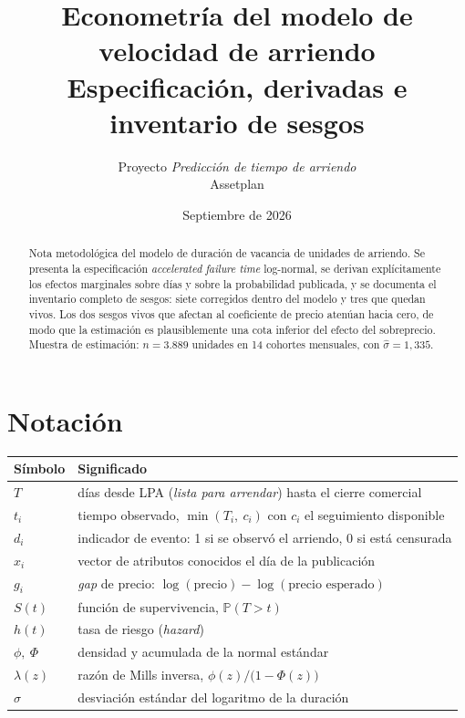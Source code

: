 \documentclass[11pt,a4paper]{article}
\title{\bfseries Econometría del modelo de velocidad de arriendo\\[2pt]
\large Especificación, derivadas e inventario de sesgos}
\author{Proyecto \emph{Predicción de tiempo de arriendo}\\ Assetplan}
\date{Septiembre de 2026}
\theoremstyle{definition}
\newcommand{\Prob}{\mathbb{P}}
\begin{document}
\maketitle

\begin{abstract}
\noindent
Nota metodológica del modelo de duración de vacancia de unidades de arriendo.
Se presenta la especificación \emph{accelerated failure time} log-normal, se
derivan explícitamente los efectos marginales sobre días y sobre la probabilidad
publicada, y se documenta el inventario completo de sesgos: siete corregidos
dentro del modelo y tres que quedan vivos. Los dos sesgos vivos que afectan al
coeficiente de precio atenúan hacia cero, de modo que la estimación es
plausiblemente una cota inferior del efecto del sobreprecio. Muestra de
estimación: $n=3.889$ unidades en 14 cohortes mensuales, con
$\hat{\sigma}=1{,}335$.
\end{abstract}

\tableofcontents
\bigskip

\section{Notación}

\begin{table}[h]
\centering
\begin{tabular}{@{}ll@{}}
\toprule
Símbolo & Significado \\
\midrule
$T$ & días desde LPA (\emph{lista para arrendar}) hasta el cierre comercial \\
$t_i$ & tiempo observado, $\min(T_i,\ c_i)$ con $c_i$ el seguimiento disponible \\
$d_i$ & indicador de evento: 1 si se observó el arriendo, 0 si está censurada \\
$x_i$ & vector de atributos conocidos el día de la publicación \\
$g_i$ & \emph{gap} de precio: $\log(\text{precio}) - \log(\text{precio esperado})$ \\
$S(t)$ & función de supervivencia, $\Prob(T>t)$ \\
$h(t)$ & tasa de riesgo (\emph{hazard}) \\
$\phi,\ \Phi$ & densidad y acumulada de la normal estándar \\
$\lambda(z)$ & razón de Mills inversa, $\phi(z)/\bigl(1-\Phi(z)\bigr)$ \\
$\sigma$ & desviación estándar del logaritmo de la duración \\
\bottomrule
\end{tabular}
\end{table}
\end{document}

